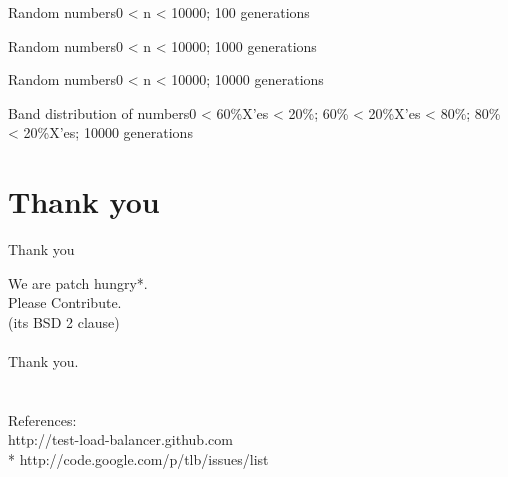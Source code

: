 \documentclass{beamer}
\begin{document}
\begin{frame}{Random numbers}{0 < n < 10000; 100 generations}
  \begin{centering}
  \end{centering}
\end{frame}

\begin{frame}{Random numbers}{0 < n < 10000; 1000 generations}
  \begin{centering}
  \end{centering}
\end{frame}

\begin{frame}{Random numbers}{0 < n < 10000; 10000 generations}
  \begin{centering}
  \end{centering}
\end{frame}

\begin{frame}{Band distribution of numbers}{0 < 60\%X'es < 20\%; 60\% < 20\%X'es < 80\%; 80\% < 20\%X'es; 10000 generations}
  \begin{centering}
  \end{centering}
\end{frame}

\section*{Thank you}

\begin{frame}{Thank you}
  \begin{centering}
  {\huge We are patch hungry*.\\Please Contribute.\\}
  (its BSD 2 clause)\\
  \quad\\
  {\huge Thank you.}\\
  \quad\\
  \quad\\
  References:\\
  http://test-load-balancer.github.com
  \quad\\
  * http://code.google.com/p/tlb/issues/list\\
  \end{centering}
\end{frame}
\end{document}
